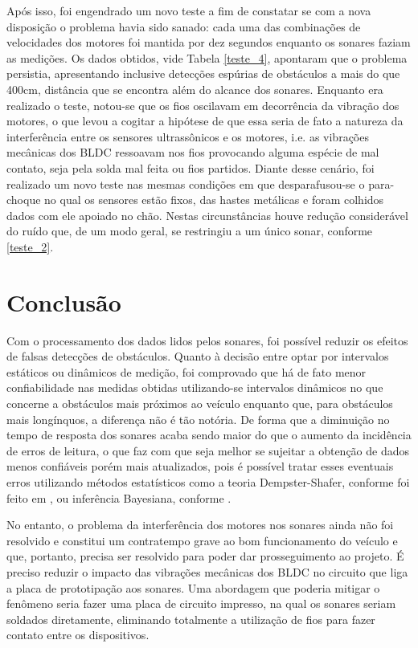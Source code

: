 Após isso, foi engendrado um novo teste a fim de constatar se com a nova disposição o problema havia sido sanado: cada uma das combinações de 
velocidades dos motores foi mantida por dez segundos enquanto os sonares faziam as medições.
Os dados obtidos, vide Tabela \ref{teste_4}, apontaram que o problema persistia, apresentando inclusive detecções espúrias de obstáculos a mais 
do que 400cm, distância que se encontra além do alcance dos sonares.
Enquanto era realizado o teste, notou-se que os fios oscilavam em decorrência da vibração dos motores, o que levou a cogitar a hipótese de que essa 
seria de fato a natureza da interferência entre os sensores ultrassônicos e os motores, i.e. as vibrações mecânicas dos BLDC ressoavam nos fios 
provocando alguma espécie de mal contato, seja pela solda mal feita ou fios partidos.
Diante desse cenário, foi realizado um novo teste nas mesmas condições em que desparafusou-se o para-choque no qual os sensores estão fixos, das 
hastes metálicas e foram colhidos dados  com ele apoiado no chão. Nestas circunstâncias houve redução considerável do ruído que, de um modo geral, se 
restringiu a um único sonar, conforme \ref{teste_2}.


\chapter{Conclusão}

Com o processamento dos dados lidos pelos sonares, foi possível reduzir os efeitos
de falsas detecções de obstáculos. Quanto à decisão entre optar por intervalos estáticos
ou dinâmicos de medição, foi comprovado que há de fato menor confiabilidade nas medidas
obtidas utilizando-se intervalos dinâmicos no que concerne a obstáculos mais próximos
ao veículo enquanto que, para obstáculos mais longínquos, a diferença não é tão notória.
De forma que a diminuição no tempo de resposta dos sonares acaba sendo maior do que
o aumento da incidência de erros de leitura, o que faz com que seja melhor se sujeitar a
obtenção de dados menos confiáveis porém mais atualizados, pois é possível tratar esses
eventuais erros utilizando métodos estatísticos como a teoria Dempster-Shafer, conforme foi feito em
 \cite{Artigo_11}, ou inferência Bayesiana, conforme \cite{Artigo_7}.
 
No entanto, o problema da interferência dos motores nos sonares ainda não foi
resolvido e constitui um contratempo grave ao bom funcionamento do veículo e que,
portanto, precisa ser resolvido para poder dar prosseguimento ao projeto. É preciso reduzir
o impacto das vibrações mecânicas dos BLDC no circuito que liga a placa de prototipação
aos sonares. Uma abordagem que poderia mitigar o fenômeno seria fazer uma placa de
circuito impresso, na qual os sonares seriam soldados diretamente, eliminando totalmente
a utilização de fios para fazer contato entre os dispositivos.

